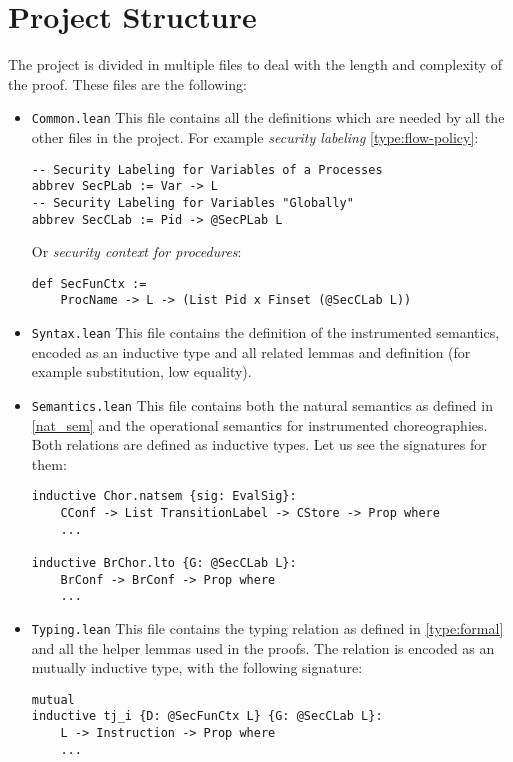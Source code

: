 \documentclass[12pt,a4paper,twoside]{book}
\begin{document}
\section{Project Structure}
The project is divided in multiple files to deal with the length and complexity of the proof. These files are the following:
\begin{itemize}
\item \texttt{Common.lean} This file contains all the definitions which are needed by all the other files in the project. For example \emph{security labeling} \ref{type:flow-policy}:
\begin{samepage}
\begin{verbatim}
-- Security Labeling for Variables of a Processes
abbrev SecPLab := Var -> L
-- Security Labeling for Variables "Globally"
abbrev SecCLab := Pid -> @SecPLab L
\end{verbatim}
\end{samepage}
Or \emph{security context for procedures}:
\begin{samepage}
\begin{verbatim}
def SecFunCtx :=
    ProcName -> L -> (List Pid x Finset (@SecCLab L))
\end{verbatim}
\end{samepage}

\item \texttt{Syntax.lean} This file contains the definition of the instrumented semantics, encoded as an inductive type and all related lemmas and definition (for example substitution, low equality).

\item \texttt{Semantics.lean} This file contains both the natural semantics as defined in \ref{nat_sem} and the operational semantics for instrumented choreographies. Both relations are defined as inductive types. Let us see the signatures for them:
\begin{samepage}
\begin{verbatim}
inductive Chor.natsem {sig: EvalSig}:
    CConf -> List TransitionLabel -> CStore -> Prop where
    ...

inductive BrChor.lto {G: @SecCLab L}:
    BrConf -> BrConf -> Prop where
    ...
\end{verbatim}
\end{samepage}
\item \texttt{Typing.lean} This file contains the typing relation as defined in \ref{type:formal} and all the helper lemmas used in the proofs. The relation is encoded as an mutually inductive type, with the following signature:
\begin{samepage}
\begin{verbatim}
mutual
inductive tj_i {D: @SecFunCtx L} {G: @SecCLab L}:
    L -> Instruction -> Prop where
    ...


\end{verbatim}
\end{samepage}
\end{itemize}
\end{document}
